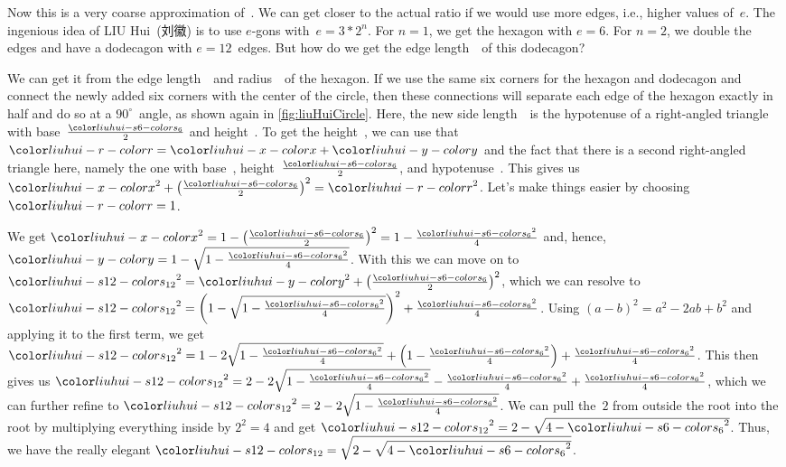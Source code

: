 Now this is a very coarse approximation of~\numberPi.
We can get closer to the actual ratio if we would use more edges, i.e., higher values of~$e$.
The ingenious idea of LIU Hui~(刘徽) is to use $e$\nobreakdashes-gons with~$e=3*2^n$.
For $n=1$, we get the hexagon with $e=6$.
For $n=2$, we double the edges and have a dodecagon with $e=12$~edges.
But how do we get the edge length~\liuhuist\ of this dodecagon?

We can get it from the edge length~\liuhuiss\ and radius~\liuhuir\ of the hexagon.
If we use the same six corners for the hexagon and dodecagon and connect the newly added six corners with the center of the circle, then these connections will separate each edge of the hexagon exactly in half and do so at a $90^\circ$~angle, as shown again in \cref{fig:liuHuiCircle}.
Here, the new side length~\liuhuist\ is the hypotenuse of a right-angled triangle with base~$\frac{\liuhuiss}{2}$ and height~\liuhuiy.
To get the height~\liuhuiy, we can use that~$\liuhuir=\liuhuix+\liuhuiy$ and the fact that there is a second right-angled triangle here, namely the one with base~\liuhuix, height~$\frac{\liuhuiss}{2}$, and hypotenuse~\liuhuir.
This gives us $\liuhuix^2+\left(\frac{\liuhuiss}{2}\right)^2=\liuhuir^2$.
Let's make things easier by choosing~$\liuhuir=1$.

We get $\liuhuix^2=1-\left(\frac{\liuhuiss}{2}\right)^2=1-\frac{\liuhuiss^2}{4}$ and, hence, $\liuhuiy=1-\sqrt{1-\frac{\liuhuiss^2}{4}}$.
With this we can move on to $\liuhuist^2=\liuhuiy^2+\left(\frac{\liuhuiss}{2}\right)^2$, which we can resolve to $\liuhuist^2=\left(1-\sqrt{1-\frac{\liuhuiss^2}{4}}\right)^2+\frac{\liuhuiss^2}{4}$.
Using $(a-b)^2=a^2-2ab+b^2$ and applying it to the first term, we get $\liuhuist^2=1-2\sqrt{1-\frac{\liuhuiss^2}{4}}+\left(1-\frac{\liuhuiss^2}{4}\right)+\frac{\liuhuiss^2}{4}$.
This then gives us $\liuhuist^2=2-2\sqrt{1-\frac{\liuhuiss^2}{4}}-\frac{\liuhuiss^2}{4}+\frac{\liuhuiss^2}{4}$, which we can further refine to $\liuhuist^2=2-2\sqrt{1-\frac{\liuhuiss^2}{4}}$.
We can pull the~$2$ from outside the root into the root by multiplying everything inside by $2^2=4$ and get $\liuhuist^2=2-\sqrt{4-\liuhuiss^2}$.
Thus, we have the really elegant $\liuhuist=\sqrt{2-\sqrt{4-\liuhuiss^2}}$.

